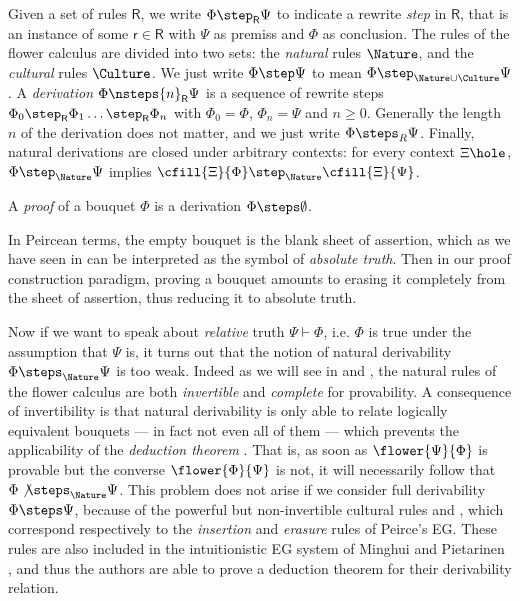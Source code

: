\begin{definition}[Derivation]
  Given a set of rules $\mathsf{R}$, we write $\Phi \step_{\mathsf{R}} \Psi$ to
  indicate a rewrite \emph{step} in $\mathsf{R}$, that is an instance of some
  $\mathsf{r} \in \mathsf{R}$ with $\Psi$ as premiss and $\Phi$ as conclusion.
  The rules of the flower calculus are divided into two sets: the \emph{natural}
  rules $\Nature$, and the \emph{cultural} rules $\Culture$. We just write $\Phi
  \step \Psi$ to mean $\Phi \step_{\Nature\cup\Culture} \Psi$. A
  \emph{derivation} $\Phi \nsteps{n}_{\mathsf{R}} \Psi$ is a sequence of rewrite
  steps $\Phi_0 \step_{\mathsf{R}} \Phi_1 \ldots \step_{\mathsf{R}} \Phi_n$ with
  $\Phi_0 = \Phi$, $\Phi_n = \Psi$ and $n \geq 0$. Generally the length $n$ of
  the derivation does not matter, and we just write $\Phi \steps_R \Psi$.
  Finally, natural derivations are closed under arbitrary contexts: for every
  context $\Xi\hole$, $\Phi \step_\Nature \Psi$ implies $\cfill{\Xi}{\Phi}
  \step_\Nature \cfill{\Xi}{\Psi}$.
\end{definition}


\begin{definition}[Proof]
  A \emph{proof} of a bouquet $\Phi$ is a derivation $\Phi \steps \emptyset$.
\end{definition}

In Peircean terms, the empty bouquet is the blank sheet of assertion, which as
we have seen in  can be interpreted as the symbol of \emph{absolute
truth}. Then in our proof construction paradigm, proving a bouquet amounts to
erasing it completely from the sheet of assertion, thus reducing it to absolute
truth.

Now if we want to speak about \emph{relative} truth $\Psi \vdash \Phi$, i.e.
$\Phi$ is true under the assumption that $\Psi$ is, it turns out that the notion
of natural derivability $\Phi \steps_{\Nature} \Psi$ is too weak. Indeed as we
will see in  and , the natural rules of
the flower calculus are both \emph{invertible} and \emph{complete} for
provability. A consequence of invertibility is that natural derivability is only
able to relate logically equivalent bouquets --- in fact not even all of them
--- which prevents the applicability of the \emph{deduction theorem}
. That is, as soon as $\flower{\Psi}{\Phi}$ is provable but
the converse $\flower{\Phi}{\Psi}$ is not, it will necessarily follow that $\Phi
\not\steps_{\Nature} \Psi$. This problem does not arise if we consider full
derivability $\Phi \steps \Psi$, because of the powerful but non-invertible
cultural rules  and , which correspond respectively to the
\emph{insertion} and \emph{erasure} rules of Peirce's EG. These rules are also
included in the intuitionistic EG system of Minghui and Pietarinen
, and thus the authors are able to prove a
deduction theorem for their derivability relation.

